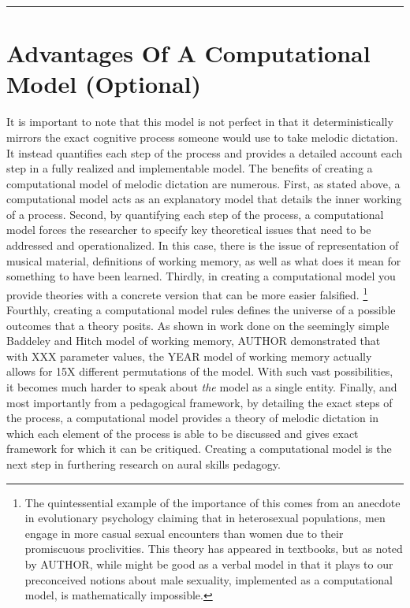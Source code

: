 \documentclass[]{book}
\let\rmarkdownfootnote\footnote%
\def\footnote{\protect\rmarkdownfootnote}
\theoremstyle{definition}
\theoremstyle{definition}
\theoremstyle{definition}
\theoremstyle{remark}
\begin{document}
\begin{center}\rule{0.5\linewidth}{\linethickness}\end{center}

\hypertarget{advantages-of-a-computational-model-optional}{%
\section{Advantages Of A Computational Model
(Optional)}\label{advantages-of-a-computational-model-optional}}

It is important to note that this model is not perfect in that it
deterministically mirrors the exact cognitive process someone would use
to take melodic dictation. It instead quantifies each step of the
process and provides a detailed account each step in a fully realized
and implementable model. The benefits of creating a computational model
of melodic dictation are numerous. First, as stated above, a
computational model acts as an explanatory model that details the inner
working of a process. Second, by quantifying each step of the process, a
computational model forces the researcher to specify key theoretical
issues that need to be addressed and operationalized. In this case,
there is the issue of representation of musical material, definitions of
working memory, as well as what does it mean for something to have been
learned. Thirdly, in creating a computational model you provide theories
with a concrete version that can be more easier falsified. \footnote{The
  quintessential example of the importance of this comes from an
  anecdote in evolutionary psychology claiming that in heterosexual
  populations, men engage in more casual sexual encounters than women
  due to their promiscuous proclivities. This theory has appeared in
  textbooks, but as noted by AUTHOR, while might be good as a verbal
  model in that it plays to our preconceived notions about male
  sexuality, implemented as a computational model, is mathematically
  impossible.} Fourthly, creating a computational model rules defines
the universe of a possible outcomes that a theory posits. As shown in
work done on the seemingly simple Baddeley and Hitch model of working
memory, AUTHOR demonstrated that with XXX parameter values, the YEAR
model of working memory actually allows for 15X different permutations
of the model. With such vast possibilities, it becomes much harder to
speak about \emph{the} model as a single entity. Finally, and most
importantly from a pedagogical framework, by detailing the exact steps
of the process, a computational model provides a theory of melodic
dictation in which each element of the process is able to be discussed
and gives exact framework for which it can be critiqued. Creating a
computational model is the next step in furthering research on aural
skills pedagogy.
\end{document}
